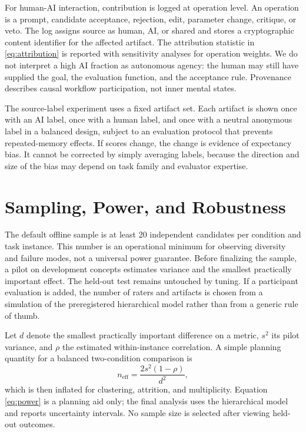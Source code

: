\documentclass[conference]{IEEEtran}
\begin{document}
For human-AI interaction, contribution is logged at operation level. An operation is a
prompt, candidate acceptance, rejection, edit, parameter change, critique, or veto. The
log assigns source as human, AI, or shared and stores a cryptographic content identifier
for the affected artifact. The attribution statistic in \eqref{eq:attribution} is
reported with sensitivity analyses for operation weights. We do not interpret a high
AI fraction as autonomous agency: the human may still have supplied the goal, the
evaluation function, and the acceptance rule. Provenance describes causal workflow
participation, not inner mental states.

The source-label experiment uses a fixed artifact set. Each artifact is shown once with
an AI label, once with a human label, and once with a neutral anonymous label in a
balanced design, subject to an evaluation protocol that prevents repeated-memory
effects. If scores change, the change is evidence of expectancy bias. It cannot be
corrected by simply averaging labels, because the direction and size of the bias may
depend on task family and evaluator expertise.

\section{Sampling, Power, and Robustness}
\label{sec:sampling}

The default offline sample is at least 20 independent candidates per condition and task
instance. This number is an operational minimum for observing diversity and failure
modes, not a universal power guarantee. Before finalizing the sample, a pilot on
development concepts estimates variance and the smallest practically important effect.
The held-out test remains untouched by tuning. If a participant evaluation is added,
the number of raters and artifacts is chosen from a simulation of the preregistered
hierarchical model rather than from a generic rule of thumb.

Let $d$ denote the smallest practically important difference on a metric, $s^2$ its
pilot variance, and $\rho$ the estimated within-instance correlation. A simple planning
quantity for a balanced two-condition comparison is
\begin{equation}
n_{\mathrm{eff}}=\frac{2s^2(1-\rho)}{d^2},
\label{eq:power}
\end{equation}
which is then inflated for clustering, attrition, and multiplicity. Equation
\eqref{eq:power} is a planning aid only; the final analysis uses the hierarchical
model and reports uncertainty intervals. No sample size is selected after viewing
held-out outcomes.
\end{document}
